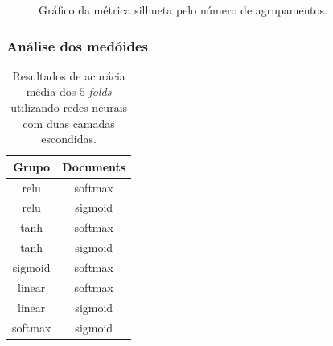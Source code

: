 \documentclass[conference]{IEEEtran}
\begin{document}
\begin{figure}[!h]
	\centering
	{
	}
	\caption{\small Gráfico da métrica silhueta pelo número de agrupamentos.}
	\label{fig:silhueta}
\end{figure}

\subsubsection{Análise dos medóides}


\begin{table}[h!]
	\centering	
	\begin{tabular}{cc} \toprule
		\textbf{Grupo} & \textbf{Documents} \\ \toprule 	
		relu                   & softmax               \\
		relu                   & sigmoid                \\
		tanh                   & softmax               \\
		tanh                   & sigmoid                \\
		sigmoid                & softmax             \\
		linear                 & softmax                \\
		linear                 & sigmoid                 \\
		softmax                & sigmoid              \\ \bottomrule      
	\end{tabular}
	\caption{\small Resultados de acurácia média dos $5$-\emph{folds} utilizando redes neurais com duas camadas escondidas.}
	\label{tab:2hl}
\end{table}
\end{document}

